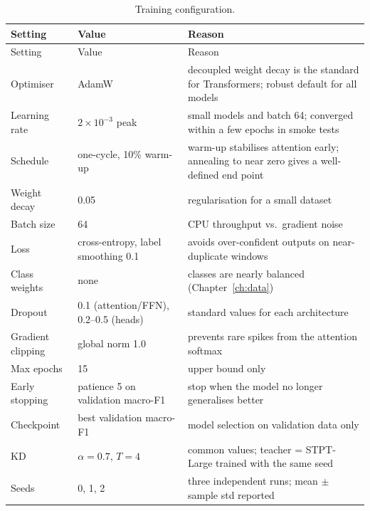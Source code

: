 \begin{longtable}{L{3.2cm}L{3.2cm}L{8.0cm}}
\caption{Training configuration.}\label{tab:hp}\\
\toprule
Setting & Value & Reason \\
\midrule\endfirsthead
\toprule Setting & Value & Reason \\ \midrule\endhead
Optimiser & AdamW \cite{loshchilov2019adamw} & decoupled weight decay is the standard for Transformers; robust default for all models \\
Learning rate & $2\times10^{-3}$ peak & small models and batch 64; converged within a few epochs in smoke tests \\
Schedule & one-cycle, 10\% warm-up & warm-up stabilises attention early; annealing to near zero gives a well-defined end point \\
Weight decay & 0.05 & regularisation for a small dataset \\
Batch size & 64 & CPU throughput vs.\ gradient noise \\
Loss & cross-entropy, label smoothing 0.1 \cite{szegedy2016inception} & avoids over-confident outputs on near-duplicate windows \\
Class weights & none & classes are nearly balanced (Chapter~\ref{ch:data}) \\
Dropout & 0.1 (attention/FFN), 0.2--0.5 (heads) & standard values for each architecture \\
Gradient clipping & global norm 1.0 & prevents rare spikes from the attention softmax \\
Max epochs & 15 & upper bound only \\
Early stopping & patience 5 on validation macro-F1 & stop when the model no longer generalises better \\
Checkpoint & best validation macro-F1 & model selection on validation data only \\
KD & $\alpha=0.7$, $T=4$ \cite{hinton2015kd} & common values; teacher = STPT-Large trained with the same seed \\
Seeds & 0, 1, 2 & three independent runs; mean $\pm$ sample std reported \\
\bottomrule
\end{longtable}

